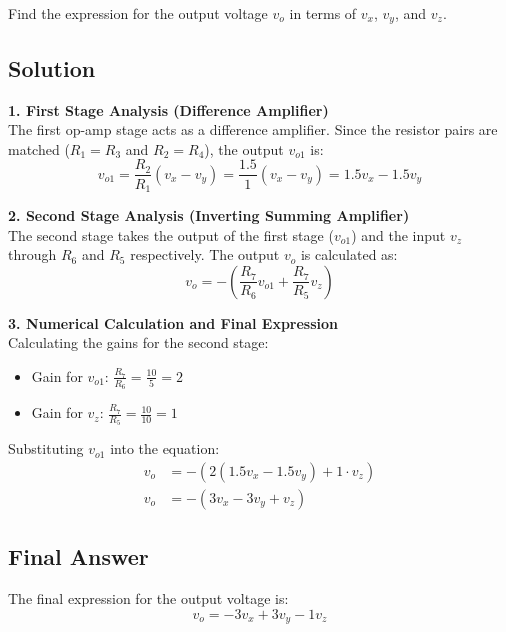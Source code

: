 \documentclass{article}
\begin{document}
Find the expression for the output voltage $v_o$ in terms of $v_x$, $v_y$, and $v_z$.
{\color{blue} 

\subsection*{Solution}

\textbf{1. First Stage Analysis (Difference Amplifier)} \\
The first op-amp stage acts as a difference amplifier. Since the resistor pairs are matched ($R_1 = R_3$ and $R_2 = R_4$), the output $v_{o1}$ is:
\begin{equation*}
    v_{o1} = \frac{R_2}{R_1}(v_x - v_y) = \frac{1.5}{1}(v_x - v_y) = 1.5v_x - 1.5v_y
\end{equation*}

\textbf{2. Second Stage Analysis (Inverting Summing Amplifier)} \\
The second stage takes the output of the first stage ($v_{o1}$) and the input $v_z$ through $R_6$ and $R_5$ respectively. The output $v_o$ is calculated as:
\begin{equation*}
    v_o = -\left( \frac{R_7}{R_6}v_{o1} + \frac{R_7}{R_5}v_z \right)
\end{equation*}

\textbf{3. Numerical Calculation and Final Expression} \\
Calculating the gains for the second stage:
\begin{itemize}
    \item Gain for $v_{o1}$: $\frac{R_7}{R_6} = \frac{10}{5} = 2$
    \item Gain for $v_z$: $\frac{R_7}{R_5} = \frac{10}{10} = 1$
\end{itemize}

Substituting $v_{o1}$ into the equation:
\begin{align*}
    v_o &= -(2(1.5v_x - 1.5v_y) + 1 \cdot v_z) \\
    v_o &= -(3v_x - 3v_y + v_z)
\end{align*}

\subsection*{Final Answer}
The final expression for the output voltage is:
\begin{equation}
    v_o = -3v_x + 3v_y - 1v_z
\end{equation}

}
\end{document}
